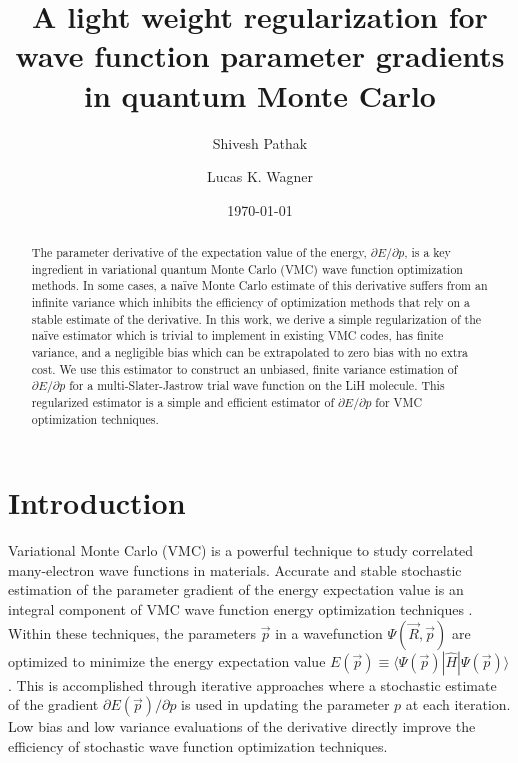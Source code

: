 \documentclass[twocolumn]{revtex4-1}
\begin{document}
\title{A light weight regularization for wave function parameter gradients
\\ in quantum Monte Carlo}

\author{Shivesh Pathak}

\author{Lucas K. Wagner}

\date{\today}
\begin{abstract}
The parameter derivative of the expectation value of the energy, $\partial E/\partial p$, is a key ingredient in variational quantum Monte Carlo (VMC) wave function optimization methods.
In some cases, a na\"ive Monte Carlo estimate of this derivative suffers from an infinite variance which inhibits the efficiency of optimization methods that rely on a stable estimate of the derivative.
In this work, we derive a simple regularization of the na\"ive estimator which is trivial to implement in existing VMC codes, has finite variance, and a negligible bias which can be extrapolated to zero bias with no extra cost.
We use this estimator to construct an unbiased, finite variance estimation of $\partial E/\partial p$ for a multi-Slater-Jastrow trial wave function on the LiH molecule.
This regularized estimator is a simple and efficient estimator of $\partial E/\partial p$ for VMC optimization techniques.
\end{abstract}
\maketitle 

\section{Introduction}

Variational Monte Carlo (VMC) is a powerful technique to study correlated many-electron wave functions in materials.
Accurate and stable stochastic estimation of the parameter gradient of the energy expectation value is an integral component of VMC wave function energy optimization techniques \cite{PhysRevB.64.024512, doi:10.1063/1.1604379, Toulouse2007, Umrigar2005, Umrigar2007, Toulouse2008}.
Within these techniques, the parameters $\vec{p}$ in a wavefunction $\Psi(\vec{R},\vec{p})$ are optimized to minimize the energy expectation value $E(\vec{p}) \equiv \langle \Psi(\vec{p})|\hat{H} |\Psi(\vec{p})\rangle$.
This is accomplished through iterative approaches where a stochastic estimate of the gradient $\partial E(\vec{p})/\partial p$ is used in updating the parameter $p$ at each iteration. 
Low bias and low variance evaluations of the derivative directly improve the efficiency of stochastic wave function optimization techniques. 
\end{document}
